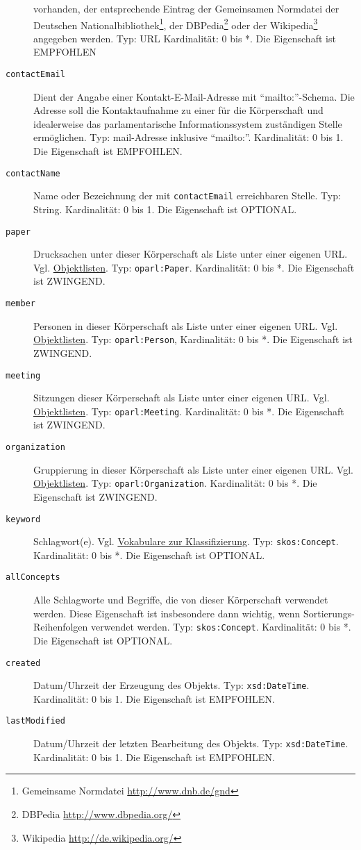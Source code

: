 \documentclass[,a4paper]{article}
\begin{document}
\begin{description}
vorhanden, der entsprechende Eintrag der Gemeinsamen Normdatei der
Deutschen Nationalbibliothek\footnote{Gemeinsame Normdatei
  \url{http://www.dnb.de/gnd}}, der DBPedia\footnote{DBPedia
  \url{http://www.dbpedia.org/}} oder der Wikipedia\footnote{Wikipedia
  \url{http://de.wikipedia.org/}} angegeben werden. Typ: URL
Kardinalität: 0 bis *. Die Eigenschaft ist EMPFOHLEN
\item[\texttt{contactEmail}]
Dient der Angabe einer Kontakt-E-Mail-Adresse mit ``mailto:''-Schema.
Die Adresse soll die Kontaktaufnahme zu einer für die Körperschaft und
idealerweise das parlamentarische Informationssystem zuständigen Stelle
ermöglichen. Typ: mail-Adresse inklusive ``mailto:''. Kardinalität: 0
bis 1. Die Eigenschaft ist EMPFOHLEN.
\item[\texttt{contactName}]
Name oder Bezeichnung der mit \texttt{contactEmail} erreichbaren Stelle.
Typ: String. Kardinalität: 0 bis 1. Die Eigenschaft ist OPTIONAL.
\item[\texttt{paper}]
Drucksachen unter dieser Körperschaft als Liste unter einer eigenen URL.
Vgl. \hyperref[objektlisten]{Objektlisten}. Typ: \texttt{oparl:Paper}.
Kardinalität: 0 bis *. Die Eigenschaft ist ZWINGEND.
\item[\texttt{member}]
Personen in dieser Körperschaft als Liste unter einer eigenen URL. Vgl.
\hyperref[objektlisten]{Objektlisten}. Typ: \texttt{oparl:Person},
Kardinalität: 0 bis *. Die Eigenschaft ist ZWINGEND.
\item[\texttt{meeting}]
Sitzungen dieser Körperschaft als Liste unter einer eigenen URL. Vgl.
\hyperref[objektlisten]{Objektlisten}. Typ: \texttt{oparl:Meeting}.
Kardinalität: 0 bis *. Die Eigenschaft ist ZWINGEND.
\item[\texttt{organization}]
Gruppierung in dieser Körperschaft als Liste unter einer eigenen URL.
Vgl. \hyperref[objektlisten]{Objektlisten}. Typ:
\texttt{oparl:Organization}. Kardinalität: 0 bis *. Die Eigenschaft ist
ZWINGEND.
\item[\texttt{keyword}]
Schlagwort(e). Vgl. \hyperref[vokabulareux5fklassifizierung]{Vokabulare
zur Klassifizierung}. Typ: \texttt{skos:Concept}. Kardinalität: 0 bis *.
Die Eigenschaft ist OPTIONAL.
\item[\texttt{allConcepts}]
Alle Schlagworte und Begriffe, die von dieser Körperschaft verwendet
werden. Diese Eigenschaft ist insbesondere dann wichtig, wenn
Sortierungs-Reihenfolgen verwendet werden. Typ: \texttt{skos:Concept}.
Kardinalität: 0 bis *. Die Eigenschaft ist OPTIONAL.
\item[\texttt{created}]
Datum/Uhrzeit der Erzeugung des Objekts. Typ: \texttt{xsd:DateTime}.
Kardinalität: 0 bis 1. Die Eigenschaft ist EMPFOHLEN.
\item[\texttt{lastModified}]
Datum/Uhrzeit der letzten Bearbeitung des Objekts. Typ:
\texttt{xsd:DateTime}. Kardinalität: 0 bis 1. Die Eigenschaft ist
EMPFOHLEN.
\end{description}
\end{document}
